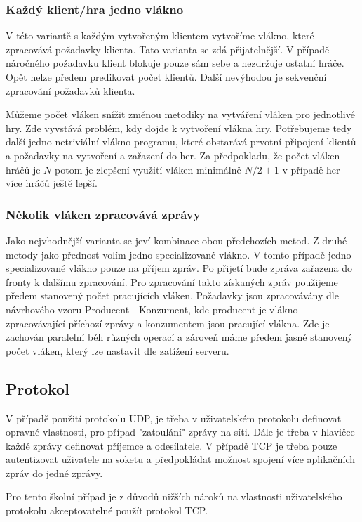 \documentclass[12pt, a4paper]{article}
\begin{document}
\subsubsection{Každý klient/hra jedno vlákno}

V této variantě s každým vytvořeným klientem vytvoříme vlákno, které zpracovává požadavky klienta. Tato varianta se zdá přijatelnější. V případě náročného požadavku klient blokuje pouze sám sebe a nezdržuje ostatní hráče. Opět nelze předem predikovat počet klientů. Další nevýhodou je sekvenční zpracování požadavků klienta.

Můžeme počet vláken snížit změnou metodiky na vytváření vláken pro jednotlivé hry. Zde vyvstává problém, kdy dojde k vytvoření vlákna hry. Potřebujeme tedy další jedno netriviální vlákno programu, které obstarává prvotní připojení klientů a požadavky na vytvoření a zařazení do her. Za předpokladu, že počet vláken hráčů je $N$ potom je zlepšení využití vláken minimálně $N/2 + 1$ v případě her více hráčů ještě lepší.

\subsubsection{Několik vláken zpracovává zprávy}

Jako nejvhodnější varianta se jeví kombinace obou předchozích metod. Z druhé metody jako přednost volím jedno specializované vlákno. V tomto případě jedno specializované vlákno pouze na příjem zpráv. Po přijetí bude zpráva zařazena do fronty k dalšímu zpracování. Pro zpracování takto získaných zpráv použijeme předem stanovený počet pracujících vláken. Požadavky jsou zpracovávány dle návrhového vzoru Producent - Konzument, kde producent je vlákno zpracovávající příchozí zprávy a konzumentem jsou pracující vlákna. Zde je zachován paralelní běh různých operací a zároveň máme předem jasně stanovený počet vláken, který lze nastavit dle zatížení serveru.

\subsection{Protokol}
V případě použití protokolu UDP, je třeba v uživatelském protokolu definovat opravné vlastnosti, pro případ "zatoulání" zprávy na síti. Dále je třeba v hlavičce každé zprávy definovat příjemce a odesílatele. V případě TCP je třeba pouze autentizovat uživatele na soketu a předpokládat možnost spojení více aplikačních zpráv do jedné zprávy.

Pro tento školní případ je z důvodů nižších nároků na vlastnosti uživatelského protokolu akceptovatelné použít protokol TCP. 
\end{document}
